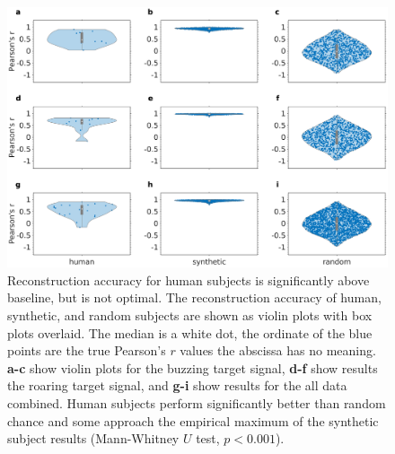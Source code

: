 \documentclass[journal]{IEEEtran}
\begin{document}
\begin{figure}[ht]
    \centering
    \includegraphics[width=\linewidth]{reconstruction_violin_1.eps}
    \caption{Reconstruction accuracy for human subjects
    is significantly above baseline, but is not optimal.
    The reconstruction accuracy of human, synthetic, and random subjects
    are shown as violin plots with box plots overlaid. The median is a white dot,
    the ordinate of the blue points are the true Pearson's $r$ values \textemdash{}
    the abscissa has no meaning.
    \textbf{a-c} show violin plots for the buzzing target signal, 
    \textbf{d-f} show results the roaring target signal,
    and \textbf{g-i} show results for the all data combined.
    Human subjects perform significantly better than random chance
    and some approach the empirical maximum of the synthetic subject results
    (Mann-Whitney $U$ test, $p < 0.001$).}
    \label{fig:reconstructions}
\end{figure}
\end{document}
